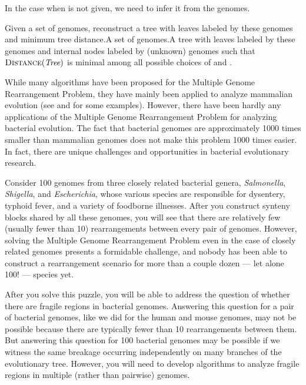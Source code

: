 \noindent In the case when  is not given, we need to infer it from the genomes.\\

\begin{problem}{Given a set of genomes, reconstruct a tree with leaves labeled by these genomes and minimum tree distance.}{A set of genomes.}{A tree  with leaves labeled by these genomes and internal nodes labeled by (unknown) genomes  such that $\text{\scshape Distance}(\textit{Tree})$ is minimal among all possible choices of  and .}
\end{problem}

\noindent While many algorithms have been proposed for the Multiple Genome Rearrangement Problem, they have mainly been applied to analyze mammalian evolution (see \cite{ma_2008} and \cite{alekseyev_pevzner_2009} for some examples).  However, there have been hardly any applications of the Multiple Genome Rearrangement Problem for analyzing bacterial evolution. The fact that bacterial genomes are approximately 1000 times smaller than mammalian genomes does not make this problem 1000 times easier. In fact, there are unique challenges and opportunities in bacterial evolutionary research.

Consider 100 genomes from three closely related bacterial genera, \textit{Salmonella}, \textit{Shigella}, and \textit{Escherichia}, whose various species are responsible for dysentery, typhoid fever, and a variety of foodborne illnesses.  After you construct synteny blocks shared by all these genomes, you will see that there are relatively few (usually fewer than 10) rearrangements between every pair of genomes. However, solving the Multiple Genome Rearrangement Problem even in the case of closely related genomes presents a formidable challenge, and nobody has been able to construct a rearrangement scenario for more than a couple dozen --- let alone 100! --- species yet.

After you solve this puzzle, you will be able to address the question of whether there are fragile regions in bacterial genomes. Answering this question for a pair of bacterial genomes, like we did for the human and mouse genomes, may not be possible because there are typically fewer than 10 rearrangements between them. But answering this question for 100 bacterial genomes may be possible if we witness the same breakage occurring independently on many branches of the evolutionary tree. However, you will need to develop algorithms to analyze fragile regions in multiple (rather than pairwise) genomes.

